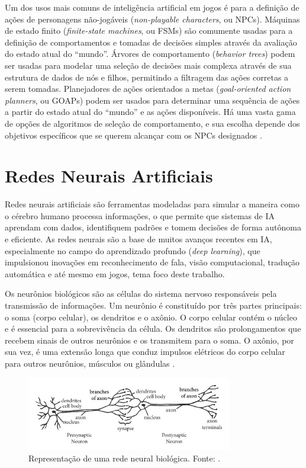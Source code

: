 Um dos usos mais comuns de inteligência artificial em jogos é para a definição de ações de personagens não-jogáveis (\textit{non-playable characters}, ou NPCs). Máquinas de estado finito (\textit{finite-state machines}, ou FSMs) são comumente usadas para a definição de comportamentos e tomadas de decisões simples através da avaliação do estado atual do “mundo”. Árvores de comportamento (\textit{behavior trees}) podem ser usadas para modelar uma seleção de decisões mais complexa através de sua estrutura de dados de nós e filhos, permitindo a filtragem das ações corretas a serem tomadas. Planejadores de ações orientados a metas (\textit{goal-oriented action planners}, ou GOAPs) podem ser usados para determinar uma sequência de ações a partir do estado atual do “mundo” e as ações disponíveis. Há uma vasta gama de opções de algoritmos de seleção de comportamento, e sua escolha depende dos objetivos específicos que se querem alcançar com os NPCs designados \cite{dawe2015behavior}.

\section{Redes Neurais Artificiais}

Redes neurais artificiais são ferramentas modeladas para simular a maneira como o cérebro humano processa informações, o que permite que sistemas de IA aprendam com dados, identifiquem padrões e tomem decisões de forma autônoma e eficiente. As redes neurais são a base de muitos avanços recentes em IA, especialmente no campo do aprendizado profundo (\textit{deep learning}), que impulsionou inovações em reconhecimento de fala, visão computacional, tradução automática e até mesmo em jogos, tema foco deste trabalho.

Os neurônios biológicos são as células do sistema nervoso responsáveis pela transmissão de informações. Um neurônio é constituído por três partes principais: o soma (corpo celular), os dendritos e o axônio. O corpo celular contém o núcleo e é essencial para a sobrevivência da célula. Os dendritos são prolongamentos que recebem sinais de outros neurônios e os transmitem para o soma. O axônio, por sua vez, é uma extensão longa que conduz impulsos elétricos do corpo celular para outros neurônios, músculos ou glândulas \cite{aggarwal2018neural}.

\begin{figure}[ht]
    \centering
    \includegraphics[width=0.8\textwidth]{BiologicalNeuron.png} %
    \caption{Representação de uma rede neural biológica. Fonte: \cite{cutter2000brain}.}
    \label{fig:BiologicalNeuron}
\end{figure}

